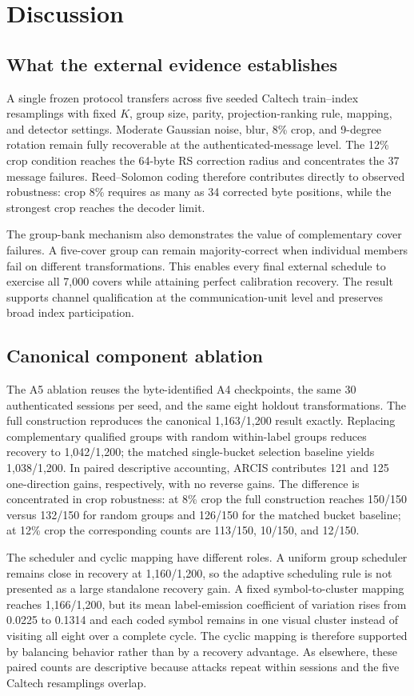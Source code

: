 \section{Discussion}
\subsection{What the external evidence establishes}
A single frozen protocol transfers across five seeded Caltech train--index resamplings with fixed $K$, group size, parity, projection-ranking rule, mapping, and detector settings. Moderate Gaussian noise, blur, 8\% crop, and 9-degree rotation remain fully recoverable at the authenticated-message level. The 12\% crop condition reaches the 64-byte RS correction radius and concentrates the 37 message failures. Reed--Solomon coding therefore contributes directly to observed robustness: crop 8\% requires as many as 34 corrected byte positions, while the strongest crop reaches the decoder limit.

The group-bank mechanism also demonstrates the value of complementary cover failures. A five-cover group can remain majority-correct when individual members fail on different transformations. This enables every final external schedule to exercise all 7,000 covers while attaining perfect calibration recovery. The result supports channel qualification at the communication-unit level and preserves broad index participation.

\subsection{Canonical component ablation}
The A5 ablation reuses the byte-identified A4 checkpoints, the same 30 authenticated sessions per seed, and the same eight holdout transformations. The full construction reproduces the canonical 1,163/1,200 result exactly. Replacing complementary qualified groups with random within-label groups reduces recovery to 1,042/1,200; the matched single-bucket selection baseline yields 1,038/1,200. In paired descriptive accounting, ARCIS contributes 121 and 125 one-direction gains, respectively, with no reverse gains. The difference is concentrated in crop robustness: at 8\% crop the full construction reaches 150/150 versus 132/150 for random groups and 126/150 for the matched bucket baseline; at 12\% crop the corresponding counts are 113/150, 10/150, and 12/150.

The scheduler and cyclic mapping have different roles. A uniform group scheduler remains close in recovery at 1,160/1,200, so the adaptive scheduling rule is not presented as a large standalone recovery gain. A fixed symbol-to-cluster mapping reaches 1,166/1,200, but its mean label-emission coefficient of variation rises from 0.0225 to 0.1314 and each coded symbol remains in one visual cluster instead of visiting all eight over a complete cycle. The cyclic mapping is therefore supported by balancing behavior rather than by a recovery advantage. As elsewhere, these paired counts are descriptive because attacks repeat within sessions and the five Caltech resamplings overlap.

